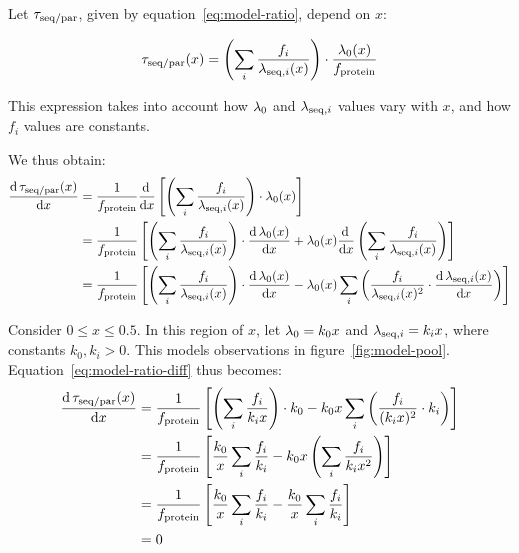 Let $\tau_{\mathrm{seq}/\mathrm{par}}$, given by equation~\ref{eq:model-ratio}, depend on $x$:

\begin{equation}
  \label{eq:model-ratio-x}
  \tau_{\mathrm{seq}/\mathrm{par}}(x) = \left( \sum_i \frac{f_i}{\lambda_{\mathrm{seq},i}(x)} \right) \cdot \frac{\lambda_{0}(x)}{f_{\mathrm{protein}}}
\end{equation}

This expression takes into account how $\lambda_{0}$ and $\lambda_{\mathrm{seq},i}$ values vary with $x$, and how $f_{i}$ values are constants.

We thus obtain:
\begin{equation}
  \begin{aligned}
  \frac{\mathrm{d} \, \tau_{\mathrm{seq}/\mathrm{par}}(x)}{\mathrm{d} x} &= \frac{1}{f_{\mathrm{protein}}} \frac{\mathrm{d} \, }{\mathrm{d} x} \left[ \left( \sum_i \frac{f_i}{\lambda_{\mathrm{seq},i}(x)} \right) \cdot \lambda_{0}(x) \right]\\
  &= \frac{1}{f_{\mathrm{protein}}} \left[ \left( \sum_i \frac{f_i}{\lambda_{\mathrm{seq},i}(x)} \right) \cdot \frac{\mathrm{d} \, \lambda_{0}(x)}{\mathrm{d} x} + \lambda_{0}(x) \frac{\mathrm{d} \, }{\mathrm{d} x} \left( \sum_i \frac{f_i}{\lambda_{\mathrm{seq},i}(x)} \right) \right]\\
  &= \frac{1}{f_{\mathrm{protein}}} \left[ \left( \sum_i \frac{f_i}{\lambda_{\mathrm{seq},i}(x)} \right) \cdot \frac{\mathrm{d} \, \lambda_{0}(x)}{\mathrm{d} x} - \lambda_{0}(x) \sum_{i}\left( \frac{f_{i}}{\lambda_{\mathrm{seq},i}(x)^{2}} \cdot \frac{\mathrm{d} \, \lambda_{\mathrm{seq},i}(x)}{\mathrm{d} x} \right) \right]
  \end{aligned}
  \label{eq:model-ratio-diff}
\end{equation}

Consider $0 \leq x \leq 0.5$.
In this region of $x$, let $\lambda_{0} = k_{0}x$ and $\lambda_{\mathrm{seq},i} = k_{i}x$, where constants $k_{0}, k_{i} > 0$.
This models observations in figure~\ref{fig:model-pool}.
Equation~\ref{eq:model-ratio-diff} thus becomes:
\begin{equation}
  \begin{aligned}
  \frac{\mathrm{d} \, \tau_{\mathrm{seq}/\mathrm{par}}(x)}{\mathrm{d} x} &= \frac{1}{f_{\mathrm{protein}}} \left[ \left( \sum_i \frac{f_i}{k_{i}x} \right) \cdot k_{0} - k_{0}x \sum_{i}\left( \frac{f_{i}}{(k_{i}x)^{2}} \cdot k_{i} \right) \right]\\
  &= \frac{1}{f_{\mathrm{protein}}} \left[ \frac{k_{0}}{x} \sum_i \frac{f_i}{k_{i}} - k_{0}x \left( \sum_{i} \frac{f_{i}}{k_{i}x^{2}} \right) \right]\\
  &= \frac{1}{f_{\mathrm{protein}}} \left[ \frac{k_{0}}{x} \sum_i \frac{f_i}{k_{i}} - \frac{k_{0}}{x} \sum_i \frac{f_i}{k_{i}} \right]\\
  &= 0
  \end{aligned}
  \label{eq:model-ratio-diff-smallx}
\end{equation}

